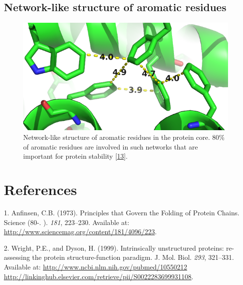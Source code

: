 \documentclass[12pt,a4paper,twoside]{book}
\theoremstyle{definition}
\theoremstyle{definition}
\theoremstyle{remark}
\begin{document}
\section{Network-like structure of aromatic
residues}\label{aromatic-network}






\begin{figure}
\includegraphics[width=0.5\linewidth]{img/coupling_matrix_analysis/aromatic_bundle} \caption{Network-like structure of aromatic
residues in the protein core. 80\% of aromatic residues are involved in
such networks that are important for protein stability
{[}\protect\hyperlink{ref-Burley1985}{13}{]}.}\label{fig:aromatic-network}
\end{figure}

\backmatter

\listoffigures
{}

\listoftables
{}

\chapter*{References}\label{references}

\hypertarget{refs}{}
\hypertarget{ref-Anfinsen1973}{}
1. Anfinsen, C.B. (1973). Principles that Govern the Folding of Protein
Chains. Science (80-. ). \emph{181}, 223--230. Available at:
\url{http://www.sciencemag.org/content/181/4096/223}.

\hypertarget{ref-Wright1999}{}
2. Wright, P.E., and Dyson, H. (1999). Intrinsically unstructured
proteins: re-assessing the protein structure-function paradigm. J. Mol.
Biol. \emph{293}, 321--331. Available at:
\href{http://www.ncbi.nlm.nih.gov/pubmed/10550212\%20http://linkinghub.elsevier.com/retrieve/pii/S0022283699931108}{http://www.ncbi.nlm.nih.gov/pubmed/10550212 http://linkinghub.elsevier.com/retrieve/pii/S0022283699931108}.
\end{document}
